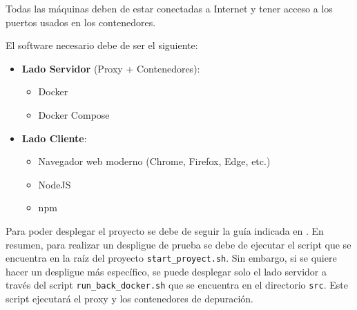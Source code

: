 Todas las máquinas deben de estar conectadas a Internet y tener acceso a los puertos usados en los contenedores. 

El software necesario debe de ser el siguiente:
\begin{itemize}
    \item \textbf{Lado Servidor} (Proxy + Contenedores):
    \begin{itemize}
        \item Docker
        \item Docker Compose
    \end{itemize}
    \item \textbf{Lado Cliente}:
    \begin{itemize}
        \item Navegador web moderno (Chrome, Firefox, Edge, etc.)
        \item NodeJS
        \item npm
    \end{itemize}   
\end{itemize}

Para poder desplegar el proyecto se debe de seguir la guía indicada en .
En resumen, para realizar un despligue de prueba se debe de ejecutar el script que se encuentra en la raíz del proyecto \texttt{start\_proyect.sh}. Sin embargo, si se quiere hacer un despligue más específico, se puede desplegar solo el lado servidor a través del script \texttt{run\_back\_docker.sh} que se encuentra en el directorio \texttt{src}. Este script ejecutará el proxy y los contenedores de depuración.